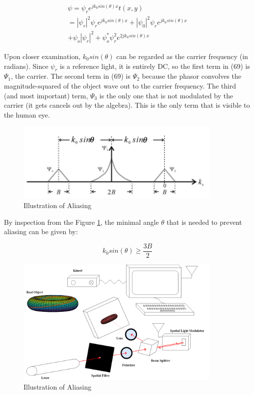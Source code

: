 \documentclass[12pt]{article}
\begin{document}
\begin{equation}
	\begin{multlined}
	\psi = \psi_{r}e^{jk_{0}sin(\theta)x}t(x,y)
	\\=|\psi_{r}|^2\psi_{r}e^{jk_{0}sin(\theta)x} + |\psi_{0}|^2\psi_{r}e^{jk_{0}sin(\theta)x}
	\\+ \psi_{o}|\psi_{r}|^2 + \psi_{o}^*\psi_{r}^2e^{2jk_{0}sin(\theta)x}
	\end{multlined}
\end{equation}

Upon closer examination, \(k_{0}sin(\theta)\) can be regarded as the carrier frequency (in radians). Since \(\psi_{r}\) is a reference light, it is entirely DC, so the first term in (69) is \(\Psi_{1}\), the carrier.
The second term in (69) is \(\Psi_{2}\) because the phasor convolves the magnitude-squared of the object wave out to the carrier frequency.
The third (and most important) term, \(\Psi_{3}\) is the only one that is not modulated by the carrier (it gets cancels out by the algebra).
This is the only term that is visible to the human eye.

\begin{figure}
    \centering
    \includegraphics[width=100mm]{tupac14.png}
    \caption{Illustration of Aliasing}
    \label{fig:aliase}
\end{figure}

By inspection from the Figure \ref{fig:aliase}, the minimal angle \(\theta\) that is needed to prevent aliasing can be given by:

\begin{equation}
	k_{0}sin(\theta) \geq \frac{3B}{2}
\end{equation}

\begin{figure}
    \centering
    \includegraphics[width=100mm]{tupac10.png}
    \caption{Illustration of Aliasing}
    \label{fig:project_setup}
\end{figure}
\end{document}
